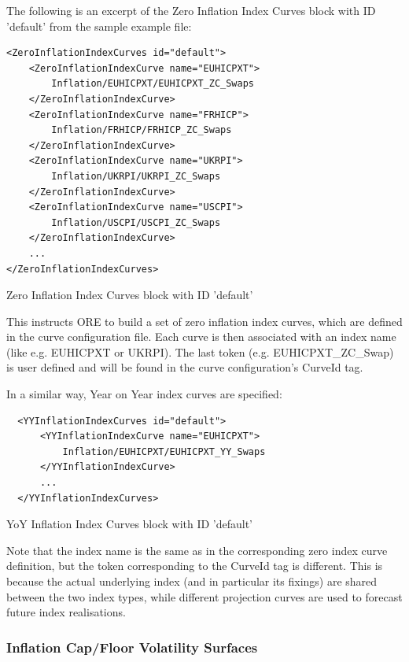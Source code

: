 \documentclass[12pt, a4paper]{article}
\begin{document}
The following is an excerpt of the Zero Inflation Index Curves block with ID 'default' from the sample example file:

\begin{listing}[H]
\begin{verbatim}
<ZeroInflationIndexCurves id="default">
    <ZeroInflationIndexCurve name="EUHICPXT">
        Inflation/EUHICPXT/EUHICPXT_ZC_Swaps
    </ZeroInflationIndexCurve>
    <ZeroInflationIndexCurve name="FRHICP">
        Inflation/FRHICP/FRHICP_ZC_Swaps
    </ZeroInflationIndexCurve>
    <ZeroInflationIndexCurve name="UKRPI">
        Inflation/UKRPI/UKRPI_ZC_Swaps
    </ZeroInflationIndexCurve>
    <ZeroInflationIndexCurve name="USCPI">
        Inflation/USCPI/USCPI_ZC_Swaps
    </ZeroInflationIndexCurve>
    ...
</ZeroInflationIndexCurves>
\end{verbatim}
\caption{Zero Inflation Index Curves block with ID 'default'}
\label{lst:zeroinflationindexcurve_spec}
\end{listing}

This instructs ORE to build a set of zero inflation index curves, which are defined in the curve configuration
file. Each curve is then associated with an index name (like e.g. EUHICPXT or UKRPI). The last token
(e.g. EUHICPXT\_ZC\_Swap) is user defined and will be found in the curve configuration's CurveId tag.

In a similar way, Year on Year index curves are specified:

\begin{listing}[H]
\begin{verbatim}
  <YYInflationIndexCurves id="default">
      <YYInflationIndexCurve name="EUHICPXT">
          Inflation/EUHICPXT/EUHICPXT_YY_Swaps
      </YYInflationIndexCurve>
      ...
  </YYInflationIndexCurves>
\end{verbatim}
\caption{YoY Inflation Index Curves block with ID 'default'}
\label{lst:yoyinflationindexcurve_spec}
\end{listing}

Note that the index name is the same as in the corresponding zero index curve definition, but the token corresponding to
the CurveId tag is different. This is because the actual underlying index (and in particular its fixings) are shared
between the two index types, while different projection curves are used to forecast future index realisations.

\subsubsection{Inflation Cap/Floor Volatility Surfaces}
\end{document}
